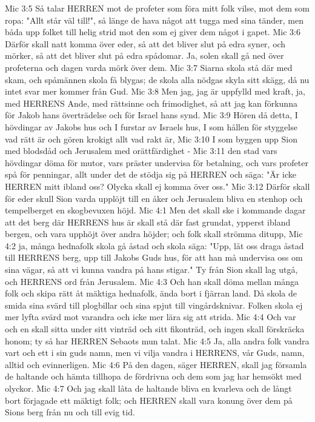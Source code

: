 Mic 3:5  Så talar HERREN mot de profeter som föra mitt folk vilse, mot dem som ropa: "Allt står väl till!", så länge de hava något att tugga med sina tänder, men båda upp folket till helig strid mot den som ej giver dem något i gapet.
Mic 3:6  Därför skall natt komma över eder, så att det bliver slut på edra syner, och mörker, så att det bliver slut på edra spådomar. Ja, solen skall gå ned över profeterna och dagen varda mörk över dem.
Mic 3:7  Siarna skola stå där med skam, och spåmännen skola få blygas; de skola alla nödgas skyla sitt skägg, då nu intet svar mer kommer från Gud.
Mic 3:8  Men jag, jag är uppfylld med kraft, ja, med HERRENS Ande, med rättsinne och frimodighet, så att jag kan förkunna för Jakob hans överträdelse och för Israel hans synd.
Mic 3:9  Hören då detta, I hövdingar av Jakobs hus och I furstar av Israels hus, I som hållen för styggelse vad rätt är och gören krokigt allt vad rakt är,
Mic 3:10  I som byggen upp Sion med blodsdåd och Jerusalem med orättfärdighet -
Mic 3:11  den stad vars hövdingar döma för mutor, vars präster undervisa för betalning, och vars profeter spå för penningar, allt under det de stödja sig på HERREN och säga: "Är icke HERREN mitt ibland oss? Olycka skall ej komma över oss."
Mic 3:12  Därför skall för eder skull Sion varda upplöjt till en åker och Jerusalem bliva en stenhop och tempelberget en skogbevuxen höjd.
Mic 4:1  Men det skall ske i kommande dagar att det berg där HERRENS hus är skall stå där fast grundat, ypperst ibland bergen, och vara upphöjt över andra höjder; och folk skall strömma ditupp,
Mic 4:2  ja, många hednafolk skola gå åstad och skola säga: "Upp, låt oss draga åstad till HERRENS berg, upp till Jakobs Guds hus, för att han må undervisa oss om sina vägar, så att vi kunna vandra på hans stigar." Ty från Sion skall lag utgå, och HERRENS ord från Jerusalem.
Mic 4:3  Och han skall döma mellan många folk och skipa rätt åt mäktiga hednafolk, ända bort i fjärran land. Då skola de smida sina svärd till plogbillar och sina spjut till vingårdsknivar. Folken skola ej mer lyfta svärd mot varandra och icke mer lära sig att strida.
Mic 4:4  Och var och en skall sitta under sitt vinträd och sitt fikonträd, och ingen skall förskräcka honom; ty så har HERREN Sebaots mun talat.
Mic 4:5  Ja, alla andra folk vandra vart och ett i sin guds namn, men vi vilja vandra i HERRENS, vår Guds, namn, alltid och evinnerligen.
Mic 4:6  På den dagen, säger HERREN, skall jag församla de haltande och hämta tillhopa de fördrivna och dem som jag har hemsökt med olyckor.
Mic 4:7  Och jag skall låta de haltande bliva en kvarleva och de långt bort förjagade ett mäktigt folk; och HERREN skall vara konung över dem på Sions berg från nu och till evig tid.
